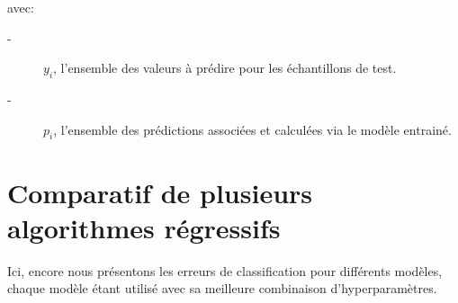 \documentclass{book}
\begin{document}
avec:
\begin{description}
\item[-] ${y_i}$, l'ensemble des valeurs à prédire pour les échantillons de test.
\item[-] ${p_i}$, l'ensemble des prédictions associées et calculées via le modèle entrainé.
\end{description}

\section{Comparatif de plusieurs algorithmes régressifs}

Ici, encore nous présentons les erreurs de classification pour différents modèles, chaque modèle étant utilisé avec sa meilleure combinaison
d'hyperparamètres.


\clearpage
\backmatter

\listoftables

\listoffigures



\end{document}
